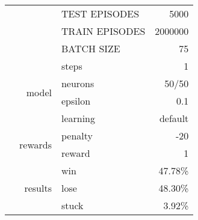 \documentclass[9pt]{article}
\begin{document}
\begin{tabularx}{\textwidth}{l|r|X|r}
	& & TEST EPISODES & 5000 \\
	& & TRAIN EPISODES & 2000000 \\
	& & BATCH SIZE & 75 \\
	& & steps & 1\\\cline{2-4}
	& \multirow{2}{*}{model} & neurons & 50/50 \\ 
	& & epsilon & 0.1\\
	& & learning & default \\\cline{2-4}
	& \multirow{2}{*}{rewards} & penalty & -20\\
	& & reward& 1\\\cline{2-4}
	& \multirow{3}{*}{results} & win & 47.78\% \\
	& & lose & 48.30\% \\
	& & stuck & 3.92\% \\
	\hline
\end{tabularx}
\end{document}
